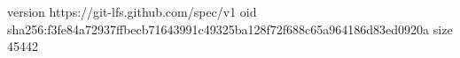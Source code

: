 version https://git-lfs.github.com/spec/v1
oid sha256:f3fe84a72937ffbecb71643991c49325ba128f72f688c65a964186d83ed0920a
size 45442
